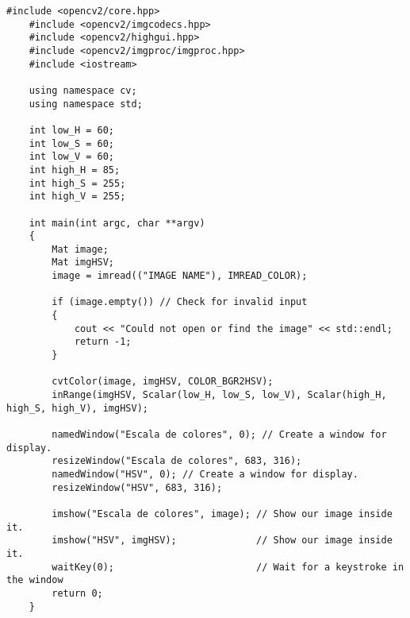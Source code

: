 \begin{lstlisting}[caption={Código en c++ que cambia de espacio de color}]
    #include <opencv2/core.hpp>
    #include <opencv2/imgcodecs.hpp>
    #include <opencv2/highgui.hpp>
    #include <opencv2/imgproc/imgproc.hpp>
    #include <iostream>
    
    using namespace cv;
    using namespace std;
    
    int low_H = 60;
    int low_S = 60;
    int low_V = 60;
    int high_H = 85;
    int high_S = 255;
    int high_V = 255;
    
    int main(int argc, char **argv)
    {
        Mat image;
        Mat imgHSV;
        image = imread(("IMAGE NAME"), IMREAD_COLOR);
    
        if (image.empty()) // Check for invalid input
        {
            cout << "Could not open or find the image" << std::endl;
            return -1;
        }
    
        cvtColor(image, imgHSV, COLOR_BGR2HSV);
        inRange(imgHSV, Scalar(low_H, low_S, low_V), Scalar(high_H, high_S, high_V), imgHSV);
    
        namedWindow("Escala de colores", 0); // Create a window for display.
        resizeWindow("Escala de colores", 683, 316);
        namedWindow("HSV", 0); // Create a window for display.
        resizeWindow("HSV", 683, 316);
    
        imshow("Escala de colores", image); // Show our image inside it.
        imshow("HSV", imgHSV);              // Show our image inside it.
        waitKey(0);                         // Wait for a keystroke in the window
        return 0;
    }
    \end{lstlisting}